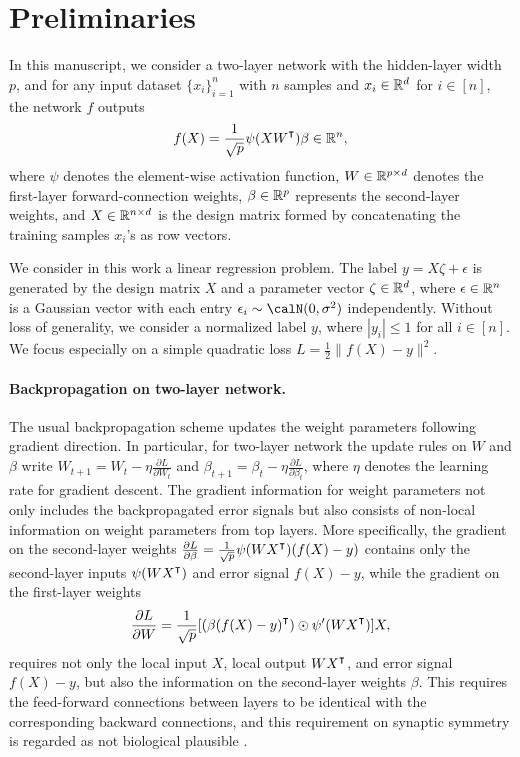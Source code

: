 \section{Preliminaries}

In this manuscript, we consider a two-layer network with the hidden-layer width $p$, and for any input dataset $\{x_i\}_{i=1}^n$ with $n$ samples and $x_i\in{\mathbb{R}^{d}}$ for $i\in[n]$, the network $f$ outputs 
\begin{align}\label{eqn:nonlinear-network}
    f(X) = \frac{1}{\sqrt p}\psi(XW\transpose)\beta \in\Rn,
\end{align}
where $\psi$ denotes the element-wise activation function, $W\in{\mathbb{R}^{p\times d}}$ denotes the first-layer forward-connection weights, $\beta\in{\mathbb{R}^{p}}$ represents the second-layer weights, and $X\in{\mathbb{R}^{n\times d}}$ is the design matrix formed by concatenating the training samples $x_i$'s as row vectors. 

We consider in this work a linear regression problem. The label $y = X\zeta + \epsilon$ is generated by the design matrix $X$ and a parameter vector $\zeta\in{\mathbb{R}^{d}}$, where $\epsilon\in{\mathbb{R}^n}$ is a Gaussian vector with each entry $\epsilon_i\sim\calN(0,\sigma^2)$ independently. Without loss of generality, we consider a normalized label $y$, where $|y_i|\leq 1$ for all $i\in[n]$. 
We focus especially on a simple quadratic loss $L = \frac{1}{2}\|f(X)-y\|^2$. 

\paragraph{Backpropagation on two-layer network.}

The usual backpropagation scheme updates the weight parameters following gradient direction. In particular, for two-layer network the update rules on $W$ and $\beta$ write $W_{t+1} = W_t - \eta \frac{\partial L}{\partial W_t}$ and $\beta_{t+1} = \beta_{t} - \eta \frac{\partial L}{\partial \beta_t}$, where $\eta$ denotes the learning rate for gradient descent. The gradient information for weight parameters not only includes the backpropagated error signals but also consists of non-local information on weight parameters from top layers. More specifically, the gradient on the second-layer weights $\frac{\partial L}{\partial \beta} = \frac{1}{\sqrt{p}} \psi(W X\transpose) (f(X) - y)$ contains only the second-layer inputs $\psi(W X\transpose)$ and error signal $f(X) - y$, while the gradient on the first-layer weights 
\begin{align}\label{eqn:backprop-gradient}
    \frac{\partial L}{\partial W} = \frac{1}{\sqrt{p}} [(\beta (f(X) - y)\transpose)\odot \psi'(WX\transpose)] X,
\end{align}
requires not only the local input $X$, local output $WX\transpose$, and error signal $f(X) - y$, but also the information on the second-layer weights $\beta$.
This requires the feed-forward connections between layers to be identical with the corresponding backward connections, and this requirement on synaptic symmetry is regarded as not biological plausible \citep{lillicrap2016random}. 

